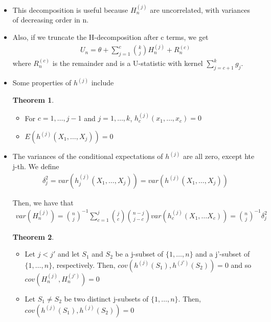 \documentclass{article}
\theoremstyle{definition}
\newtheorem{theorem}{Theorem}
\numberwithin{Def}{section}
\begin{document}
\begin{itemize}
    \item This decomposition is useful because $H_n^{(j)}$ are uncorrelated, with variances of decreasing order in n. 
    \item Also, if we truncate the H-decomposition after c terms, we get 
    \begin{align*}
        U_n = \theta + \sum_{j=1}^c {k \choose j}H_n^{(j)} + R_n^{(c)}
    \end{align*}
    where $R_n^{(c)}$ is the remainder and is a U-statistic with kernel $\sum_{j=c+1}^k g_j$.
    
    \item Some properties of $h^{(j)}$ include
    \begin{theorem}
    \begin{itemize}
        \item For $c = 1, \dotsc, j-1$ and $j = 1, \dotsc, k$, $h_c^{(j)}(x_1, \dotsc, x_c) = 0$
        \item $E(h^{(j)}(X_1, \dotsc, X_j)) = 0$
    \end{itemize}
    \end{theorem}
    
    \item The variances of the conditional expectations of $h^{(j)}$ are all zero, except hte j-th. We define \begin{align}
        \delta_j^2 = var(h_j^{(j)}(X_1, \dotsc, X_j)) = var(h^{(j)}(X_1, \dotsc, X_j))
    \end{align}
    
    Then, we have that 
    \begin{align}
        var(H_n^{(j)}) = {n \choose j}^{-1}\sum_{c=1}^j {j \choose c}{n-j \choose j-c}var(h_c^{(j)}(X_1, \dotsc X_c)) = {n \choose j}^{-1}\delta_j^2
    \end{align}
    
    \begin{theorem}
    \begin{itemize}
        \item Let $j <j'$ and let $S_1$ and $S_2$ be a j-subset of $\{1, \dotsc, n\}$ and a j'-subset of $\{1, \dotsc, n\}$, respectively. Then, $cov(h^{(j)}(S_1), h^{(j')}(S_2)) = 0$ and so $cov(H_n^{(j)}, H_n^{(j')}) = 0$
        \item Let $S_1 \neq S_2$ be two distinct j-subsets of $\{1, \dotsc, n\}$. Then, $cov(h^{(j)}(S_1), h^{(j)}(S_2)) = 0$
    \end{itemize}
    \end{theorem}
    

\end{itemize}
\end{document}
